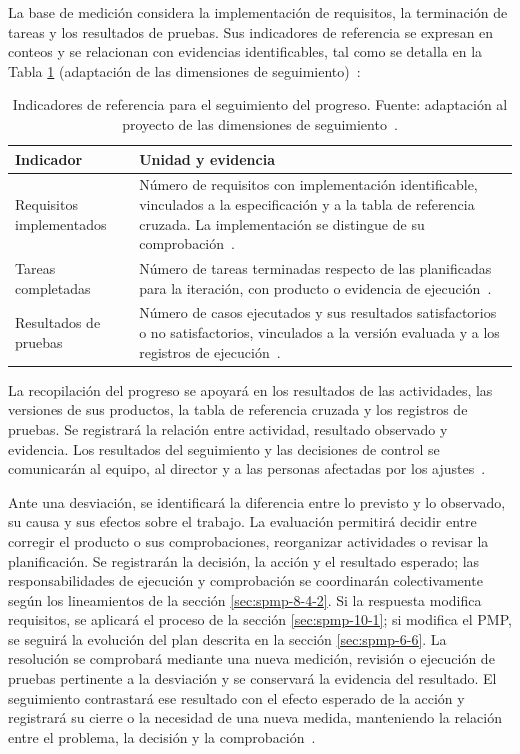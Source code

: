 La base de medición considera la implementación de requisitos, la terminación de tareas y los resultados de pruebas. Sus indicadores de referencia se expresan en conteos y se relacionan con evidencias identificables, tal como se detalla en la Tabla \ref{tab:indicadores-seguimiento} (adaptación de las dimensiones de seguimiento)~\cite{adaptacion2026}:

\begin{table}[htbp]
\centering
\caption{Indicadores de referencia para el seguimiento del progreso. Fuente: adaptación al proyecto de las dimensiones de seguimiento~\cite{adaptacion2026}.}
\label{tab:indicadores-seguimiento}
\begin{tabular}{|p{}|p{}|}
\hline
\textbf{Indicador} & \textbf{Unidad y evidencia} \\ \hline
Requisitos implementados & Número de requisitos con implementación identificable, vinculados a la especificación y a la tabla de referencia cruzada. La implementación se distingue de su comprobación~\cite{adaptacion2026,std29148}. \\ \hline
Tareas completadas & Número de tareas terminadas respecto de las planificadas para la iteración, con producto o evidencia de ejecución~\cite{adaptacion2026}. \\ \hline
Resultados de pruebas & Número de casos ejecutados y sus resultados satisfactorios o no satisfactorios, vinculados a la versión evaluada y a los registros de ejecución~\cite{adaptacion2026,std29119p2,std29119p3}. \\ \hline
\end{tabular}
\end{table}

La recopilación del progreso se apoyará en los resultados de las actividades, las versiones de sus productos, la tabla de referencia cruzada y los registros de pruebas. Se registrará la relación entre actividad, resultado observado y evidencia. Los resultados del seguimiento y las decisiones de control se comunicarán al equipo, al director y a las personas afectadas por los ajustes~\cite{adaptacion2026,std12207,ieee730}.

Ante una desviación, se identificará la diferencia entre lo previsto y lo observado, su causa y sus efectos sobre el trabajo. La evaluación permitirá decidir entre corregir el producto o sus comprobaciones, reorganizar actividades o revisar la planificación. Se registrarán la decisión, la acción y el resultado esperado; las responsabilidades de ejecución y comprobación se coordinarán colectivamente según los lineamientos de la sección \ref{sec:spmp-8-4-2}. Si la respuesta modifica requisitos, se aplicará el proceso de la sección \ref{sec:spmp-10-1}; si modifica el PMP, se seguirá la evolución del plan descrita en la sección \ref{sec:spmp-6-6}. La resolución se comprobará mediante una nueva medición, revisión o ejecución de pruebas pertinente a la desviación y se conservará la evidencia del resultado. El seguimiento contrastará ese resultado con el efecto esperado de la acción y registrará su cierre o la necesidad de una nueva medida, manteniendo la relación entre el problema, la decisión y la comprobación~\cite{adaptacion2026,std12207,ieee730}.